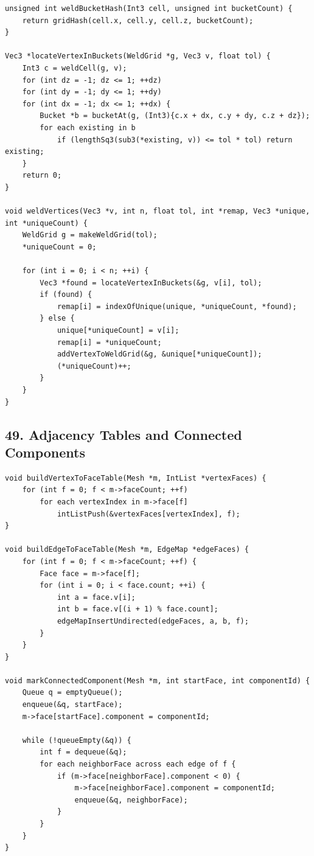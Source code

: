 \documentclass[10pt,letterpaper]{article}
\begin{document}
\begin{verbatim}
unsigned int weldBucketHash(Int3 cell, unsigned int bucketCount) {
    return gridHash(cell.x, cell.y, cell.z, bucketCount);
}

Vec3 *locateVertexInBuckets(WeldGrid *g, Vec3 v, float tol) {
    Int3 c = weldCell(g, v);
    for (int dz = -1; dz <= 1; ++dz)
    for (int dy = -1; dy <= 1; ++dy)
    for (int dx = -1; dx <= 1; ++dx) {
        Bucket *b = bucketAt(g, (Int3){c.x + dx, c.y + dy, c.z + dz});
        for each existing in b
            if (lengthSq3(sub3(*existing, v)) <= tol * tol) return existing;
    }
    return 0;
}

void weldVertices(Vec3 *v, int n, float tol, int *remap, Vec3 *unique, int *uniqueCount) {
    WeldGrid g = makeWeldGrid(tol);
    *uniqueCount = 0;

    for (int i = 0; i < n; ++i) {
        Vec3 *found = locateVertexInBuckets(&g, v[i], tol);
        if (found) {
            remap[i] = indexOfUnique(unique, *uniqueCount, *found);
        } else {
            unique[*uniqueCount] = v[i];
            remap[i] = *uniqueCount;
            addVertexToWeldGrid(&g, &unique[*uniqueCount]);
            (*uniqueCount)++;
        }
    }
}
\end{verbatim}


\subsection*{49. Adjacency Tables and Connected Components}

\begin{verbatim}
void buildVertexToFaceTable(Mesh *m, IntList *vertexFaces) {
    for (int f = 0; f < m->faceCount; ++f)
        for each vertexIndex in m->face[f]
            intListPush(&vertexFaces[vertexIndex], f);
}

void buildEdgeToFaceTable(Mesh *m, EdgeMap *edgeFaces) {
    for (int f = 0; f < m->faceCount; ++f) {
        Face face = m->face[f];
        for (int i = 0; i < face.count; ++i) {
            int a = face.v[i];
            int b = face.v[(i + 1) % face.count];
            edgeMapInsertUndirected(edgeFaces, a, b, f);
        }
    }
}

void markConnectedComponent(Mesh *m, int startFace, int componentId) {
    Queue q = emptyQueue();
    enqueue(&q, startFace);
    m->face[startFace].component = componentId;

    while (!queueEmpty(&q)) {
        int f = dequeue(&q);
        for each neighborFace across each edge of f {
            if (m->face[neighborFace].component < 0) {
                m->face[neighborFace].component = componentId;
                enqueue(&q, neighborFace);
            }
        }
    }
}
\end{verbatim}
\end{document}
